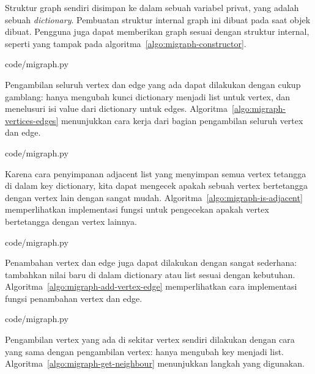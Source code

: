 Struktur graph sendiri disimpan ke dalam sebuah variabel privat, yang adalah sebuah \textit{dictionary}. Pembuatan struktur internal graph ini dibuat pada saat objek dibuat. Pengguna juga dapat memberikan graph sesuai dengan struktur internal, seperti yang tampak pada algoritma~\ref{algo:migraph-constructor}.


                {code/migraph.py}

Pengambilan seluruh vertex dan edge yang ada dapat dilakukan dengan cukup gamblang: hanya mengubah kunci dictionary menjadi list untuk vertex, dan menelusuri isi value dari dictionary untuk edges. Algoritma~\ref{algo:migraph-vertices-edges} menunjukkan cara kerja dari bagian pengambilan seluruh vertex dan edge.


                {code/migraph.py}

Karena cara penyimpanan adjacent list yang menyimpan semua vertex tetangga di dalam key dictionary, kita dapat mengecek apakah sebuah vertex bertetangga dengan vertex lain dengan sangat mudah. Algoritma~\ref{algo:migraph-is-adjacent} memperlihatkan implementasi fungsi untuk pengecekan apakah vertex bertetangga dengan vertex lainnya.


                {code/migraph.py}

Penambahan vertex dan edge juga dapat dilakukan dengan sangat sederhana: tambahkan nilai baru di dalam dictionary atau list sesuai dengan kebutuhan. Algoritma~\ref{algo:migraph-add-vertex-edge} memperlihatkan cara implementasi fungsi penambahan vertex dan edge.


                {code/migraph.py}

Pengambilan vertex yang ada di sekitar vertex sendiri dilakukan dengan cara yang sama dengan pengambilan vertex: hanya mengubah key menjadi list. Algoritma~\ref{algo:migraph-get-neighbour} menunjukkan langkah yang digunakan.

